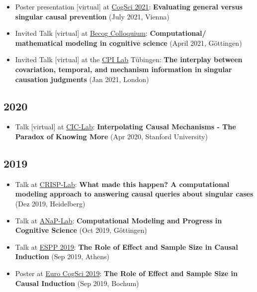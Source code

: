 \documentclass[
]{article}
\providecommand{\tightlist}{%
  \setlength{\itemsep}{0pt}\setlength{\parskip}{0pt}}
\begin{document}
\begin{itemize}
\item
  Poster presentation {[}virtual{]} at
  \href{https://cognitivesciencesociety.org/cogsci-2021/}{CogSci 2021}:
  \textbf{Evaluating general versus singular causal prevention} (July
  2021, Vienna)
  {\href{publications/Poster_Stephan_et_al_CogSci_2021.pdf}{}}
\item
  Invited Talk {[}virtual{]} at
  \href{https://www.uni-goettingen.de/en/colloquium/355791.html}{Becog
  Colloquium}: \textbf{Computational/ mathematical modeling in cognitive
  science} (April 2021, Göttingen)
\item
  Invited Talk {[}virtual{]} at the \href{https://cpilab.org/}{CPI Lab}
  Tübingen: \textbf{The interplay between covariation, temporal, and
  mechanism information in singular causation judgments} (Jan 2021,
  London)
\end{itemize}

\hypertarget{section-2}{%
\subsection{2020}\label{section-2}}

\begin{itemize}
\tightlist
\item
  Talk {[}virtual{]} at \href{http://cicl.stanford.edu/}{CIC-Lab}:
  \textbf{Interpolating Causal Mechanisms - The Paradox of Knowing More}
  (Apr 2020, Stanford University)
\end{itemize}

\hypertarget{section-3}{%
\subsection{2019}\label{section-3}}

\begin{itemize}
\item
  Talk at
  \href{https://www.psychologie.uni-heidelberg.de/ae/crisp/Home.html}{CRISP-Lab}:
  \textbf{What made this happen? A computational modeling approach to
  answering causal queries about singular cases} (Dez 2019, Heidelberg)
\item
  Talk at \href{https://www.psych.uni-goettingen.de/de/anap}{ANaP-Lab}:
  \textbf{Computational Modeling and Progress in Cognitive Science} (Oct
  2019, Göttingen)
\item
  Talk at \href{https://www.europeanspp.org/meetings.html}{ESPP 2019}:
  \textbf{The Role of Effect and Sample Size in Causal Induction} (Sep
  2019, Athens)
\item
  Poster at
  \href{https://www.ruhr-uni-bochum.de/philosophy/EuroCogSci2019/home}{Euro
  CogSci 2019}: \textbf{The Role of Effect and Sample Size in Causal
  Induction} (Sep 2019, Bochum)
  {\href{publications/Poster_EuroCogSci_2019.pdf}{}}
\end{itemize}
\end{document}
